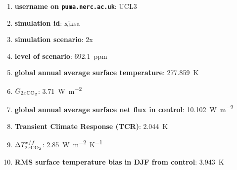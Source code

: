 \documentclass{article}
\begin{document}
\begin{enumerate}
    \item \textbf{username on \texttt{puma.nerc.ac.uk}}: UCL3
    \item \textbf{simulation id}: xjksa
    \item \textbf{simulation scenario}: 2x
    \item \textbf{ level of scenario}: \SI{692.1}{ppm}
    \item \textbf{global annual average surface temperature}: \SI{277.859}{K}
    \item \textbf{$G_{2x\ce{CO2}}$}: \SI{3.71}{W.m^{-2}}
    \item \textbf{global annual average surface net flux in control}: \SI{10.102}{W.m^{-2}}
    \item \textbf{Transient Climate Response (TCR)}: \SI{2.044}{K}
    \item \textbf{$\Delta T^{eff}_{2x\ce{CO2}}$}: \SI{2.85}{W.m^{-2}.K^{-1}}
    \item \textbf{RMS surface temperature bias in DJF from control}: \SI{3.943}{K} %
\end{enumerate}
\end{document}
